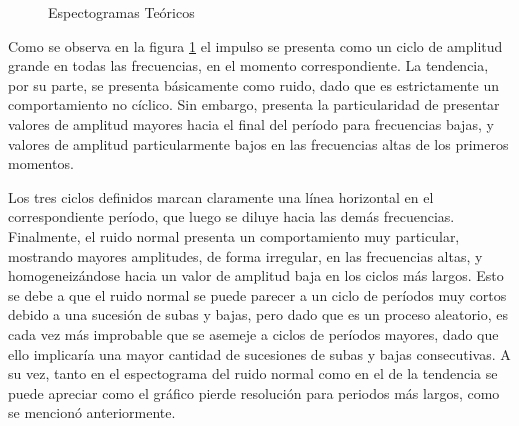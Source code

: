 \documentclass[a4paper]{article}
\begin{document}
\begin{figure}[H]
	    \vspace{0.00mm}
	    \vspace{0.00mm}
	\caption{Espectogramas Teóricos} \label{fig:espect_teo}
\end{figure}

Como se observa en la figura \ref{fig:espect_teo} el impulso se presenta como un ciclo de amplitud grande en todas las frecuencias, en el momento correspondiente. La tendencia, por su parte, se presenta básicamente como ruido, dado que es estrictamente un comportamiento no cíclico. Sin embargo, presenta la particularidad de presentar valores de amplitud mayores hacia el final del período para frecuencias bajas, y valores de amplitud particularmente bajos en las frecuencias altas de los primeros momentos.

Los tres ciclos definidos marcan claramente una línea horizontal en el correspondiente período, que luego se diluye hacia las demás frecuencias. Finalmente, el ruido normal presenta un comportamiento muy particular, mostrando mayores amplitudes, de forma irregular, en las frecuencias altas, y homogeneizándose hacia un valor de amplitud baja en los ciclos más largos. Esto se debe a que el ruido normal se puede parecer a un ciclo de períodos muy cortos debido a una sucesión de subas y bajas, pero dado que es un proceso aleatorio, es cada vez más improbable que se asemeje a ciclos de períodos mayores, dado que ello implicaría una mayor cantidad de sucesiones de subas y bajas consecutivas. A su vez, tanto en el espectograma del ruido normal como en el de la tendencia se puede apreciar como el gráfico pierde resolución para periodos más largos, como se mencionó anteriormente. 
\end{document}
